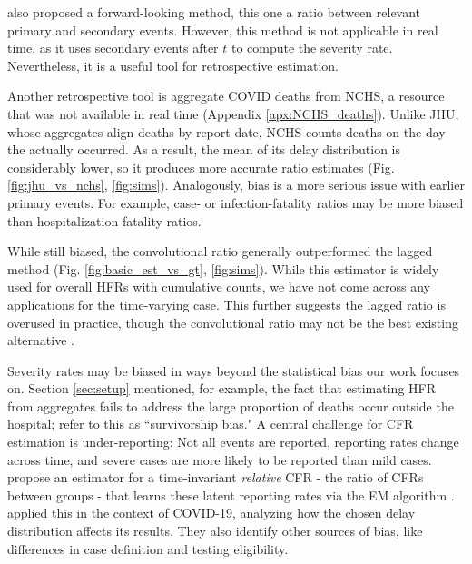 \documentclass{article}
\begin{document}
\citeauthor{UKpaper} also proposed a forward-looking method, this one a ratio between relevant primary and secondary events. However, this method is not applicable in real time, as it uses secondary events after $t$ to compute the severity rate. Nevertheless, it is a useful tool for retrospective estimation. 

Another retrospective tool is aggregate COVID deaths from NCHS, a resource that was not available in real time (Appendix \ref{apx:NCHS_deaths}). Unlike JHU, whose aggregates align deaths by report date, NCHS counts deaths on the day the actually occurred. As a result, the mean of its delay distribution is considerably lower, so it produces more accurate ratio estimates (Fig. \ref{fig:jhu_vs_nchs}, \ref{fig:sims}). Analogously, bias is a more serious issue with earlier primary events. For example, case- or infection-fatality ratios may be more biased than hospitalization-fatality ratios. 


While still biased, the convolutional ratio generally outperformed the lagged method (Fig. \ref{fig:basic_est_vs_gt}, \ref{fig:sims}). While this estimator is widely used for overall HFRs with cumulative counts, we have not come across any applications for the time-varying case. This further suggests the lagged ratio is overused in practice, though the convolutional ratio may not be the best existing alternative \cite{fusedlasso, UKpaper}.

Severity rates may be biased in ways beyond the statistical bias our work focuses on. Section \ref{sec:setup} mentioned, for example, the fact that estimating HFR from aggregates fails to address the large proportion of deaths occur outside the hospital; \citeauthor{lipsitch2015potential} refer to this as ``survivorship bias." A central challenge for CFR estimation is under-reporting: Not all events are reported, reporting rates change across time, and severe cases are more likely to be reported than mild cases. \citeauthor{reich2012estimating} propose an estimator for a time-invariant \textit{relative} CFR - the ratio of CFRs between groups - that learns these latent reporting rates via the EM algorithm \cite{EM}. \citeauthor{anastasios} applied this in the context of COVID-19, analyzing how the chosen delay distribution affects its results. They also identify other sources of bias, like differences in case definition and testing eligibility.
\end{document}
